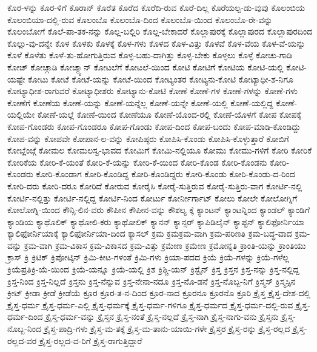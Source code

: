 {ಕೊರ-ಳನ್ನು
ಕೊರ-ಳಿಗೆ
ಕೊರಾನ್
ಕೊರೆತ
ಕೊರೆದ
ಕೊರೆದಿ-ರುವ
ಕೊರೆ-ದಿಲ್ಲ
ಕೊರೆಯಲ್ಪ-ಡು-ವುವು
ಕೊಲಂಬಿಯ
ಕೊಲಂಬಿಯಾ-ದಲ್ಲಿ-ರುವ
ಕೊಲಂಬೊ
ಕೊಲಂಬೊ-ದಿಂದ
ಕೊಲಂಬೊ-ಯಿಂದ
ಕೊಲಂಬೊ-ರೇ-ವನ್ನು
ಕೊಲಂಬೋಗೆ
ಕೊಲೆ-ಪಾ-ತಕ-ನನ್ನು
ಕೊಲ್ಲ-ಬಲ್ಲಿರಿ
ಕೊಲ್ಲ-ಬೇಕಾದರೆ
ಕೊಲ್ಲಾಪುರಕ್ಕೆ
ಕೊಲ್ಲಾಪುರದ
ಕೊಲ್ಲಾಪುರದಿಂದ
ಕೊಲ್ಲು-ವು-ದನ್ನೇ
ಕೊಳ
ಕೊಳಕು
ಕೊಳಕ್ಕೆ
ಕೊಳ-ಗಳು
ಕೊಳದ
ಕೊಳ-ವಿತ್ತು
ಕೊಳವೆ
ಕೊಳ-ವೆಯ
ಕೊಳ-ವೆ-ಯನ್ನು
ಕೊಳೆ
ಕೊಳೆತು
ಕೊಳೆ-ತು-ಹೋಗುತ್ತಿರುವ
ಕೊಳ್ಳ-ಬಹು-ದಾಗಿತ್ತು
ಕೊಳ್ಳ-ಬೇಕು
ಕೊಳ್ಳಲು
ಕೊಳ್ಳೆ
ಕೋಚು-ಗಾಡಿ
ಕೋಚ್
ಕೋಚ್ಗಾಡಿ
ಕೋಚ್ಮ್ಯಾನ್
ಕೋಟಲೆಗೆ
ಕೋಟಲೆ-ಯಿಂದ
ಕೋಟಿ
ಕೋಟಿಗೆ
ಕೋಟಿಯ
ಕೋಟಿ-ಯಲ್ಲಿ
ಕೋಟಿ-ಯಷ್ಟೇ
ಕೋಟು
ಕೋಟೆ
ಕೋಟೆ-ಯನ್ನು
ಕೋಟೆ-ಯಿಂದ
ಕೋಟ್ಯಂತರ
ಕೋಟ್ಯನು-ಕೋಟಿ
ಕೋಟ್ಯಾಧೀ-ಶ-ನಿಗೂ
ಕೋಟ್ಯಾಧೀಶ-ರಾಗುವರೆ
ಕೋಟ್ಯಾಧೀಶರು
ಕೋಟ್ಯಾನು-ಕೋಟಿ
ಕೋಣೆ
ಕೋಣೆ-ಗಳ
ಕೋಣೆ-ಗಳನ್ನು
ಕೋಣೆ-ಗಳು
ಕೋಣೆಗೆ
ಕೋಣೆಯ
ಕೋಣೆ-ಯನ್ನು
ಕೋಣೆ-ಯನ್ನೆಲ್ಲ
ಕೋಣೆ-ಯನ್ನೇ
ಕೋಣೆ-ಯಲ್ಲಿ
ಕೋಣೆ-ಯಲ್ಲಿದ್ದ
ಕೋಣೆ-ಯಲ್ಲಿಯೇ
ಕೋಣೆ-ಯಲ್ಲೆ
ಕೋಣೆ-ಯಿಂದ
ಕೋಣೆಯೂ
ಕೋಣೆ-ಯೊಂದ-ರಲ್ಲಿ
ಕೋಣೆ-ಯೊಳಗೆ
ಕೋಪ
ಕೋಪಕ್ಕೆ
ಕೋಪ-ಗೊಂಡರು
ಕೋಪ-ಗೊಂಡರೂ
ಕೋಪ-ಗೊಂಡು
ಕೋಪ-ದಿಂದ
ಕೋಪ-ಬಂದು
ಕೋಪ-ಮಾಡಿ-ಕೊಂಡಿದ್ದು
ಕೋಪ-ವನ್ನು
ಕೋಪವೇ
ಕೋಪಾನ-ಲ-ವನ್ನು
ಕೋಪಿಷ್ಠರು
ಕೋಪಿಸಿ-ಕೊಂಡು
ಕೋಪಿಸಿ-ಕೊಳ್ಳುತ್ತಾರೆ
ಕೋಬಿಗೆ
ಕೋಬ್ಲೆಂಜ್ಗೆ
ಕೋಮಲ
ಕೋಮಲಸ್ವ-ಭಾವದ
ಕೋಮಿಗೆ
ಕೋಮಿ-ನಲ್ಲಿಯೂ
ಕೋಮು
ಕೋಮು-ಗಳಿಗೆ
ಕೋರಿ
ಕೋರಿಕೆ
ಕೋರಿಕೆಯ
ಕೋರಿ-ಕೆ-ಯಂತೆ
ಕೋರಿ-ಕೆ-ಯನ್ನು
ಕೋರಿ-ಕೆ-ಯಿಂದ
ಕೋರಿ-ಕೊಂಡ
ಕೋರಿ-ಕೊಂಡನು
ಕೋರಿ-ಕೊಂಡರು
ಕೋರಿ-ಕೊಂಡಾಗ
ಕೋರಿ-ಕೊಂಡಿದ್ದ
ಕೋರಿ-ಕೊಂಡಿದ್ದರು
ಕೋರಿ-ಕೊಂಡು
ಕೋರಿ-ಕೊಂಡು-ದ-ರಿಂದ
ಕೋರಿ-ದರು
ಕೋರಿ-ದರೂ
ಕೋರಿದೆ
ಕೋರುವ
ಕೋರೈಸಿ
ಕೋರೈ-ಸುತ್ತಿರುವ
ಕೋರೈ-ಸುತ್ತಿರು-ವಾಗ
ಕೋರ್ಟಿ-ನಲ್ಲಿ
ಕೋರ್ಟಿ-ನಲ್ಲಿತ್ತು
ಕೋರ್ಟಿ-ನಲ್ಲಿದ್ದ
ಕೋರ್ಟಿ-ನಿಂದ
ಕೋರ್ಟು
ಕೋರ್ನೀರ್ಗಾಟ್
ಕೋಲು
ಕೋಲೇ
ಕೋಲೋಗ್ನಿಗೆ
ಕೋಲೋಗ್ನಿ-ಯಿಂದ
ಕೌನ್ಸಿ-ಲಿನ-ವರು
ಕೌಪೀನ
ಕೌಪೀನ-ವನ್ನು
ಕೌಶಲ್ಯ
ಕ್ಕೆ
ಕ್ಯಾಂಟನ್
ಕ್ಯಾಂಟನ್ನಿಂದ
ಕ್ಯಾಂಡಲ್
ಕ್ಯಾಂಡಿಗೆ
ಕ್ಯಾಂಡಿಯ
ಕ್ಯಾಥೊಲಿಕ್
ಕ್ಯಾಥೋಲಿ-ಕರು
ಕ್ಯಾಥೋಲಿಕ್
ಕ್ಯಾನನ್
ಕ್ಯಾನ್ಸರ್
ಕ್ಯಾಪಿಡಿಲೈನ್
ಕ್ಯಾಪ್ಟನ್
ಕ್ಯಾಲಿಫೋರ್ನಿಯಾ
ಕ್ಯಾಲಿಫೋರ್ನಿಯಾಕ್ಕೆ
ಕ್ಯಾಲಿಫೋರ್ನಿಯಾ-ದಿಂದ
ಕ್ಯಾಸಲ್
ಕ್ರಮ
ಕ್ರಮಕ್ರಮ-ವಾಗಿ
ಕ್ರಮ-ಪರಿಣತಿ
ಕ್ರಮ-ಬದ್ಧ-ವಾದ
ಕ್ರಮ-ವನ್ನು
ಕ್ರಮ-ವಾಗಿ
ಕ್ರಮ-ವಿಕಾಸ
ಕ್ರಮ-ವಿಕಾಸದ
ಕ್ರಮ-ವಿತ್ತು
ಕ್ರಮೇಣ
ಕ್ರಮೇಣ
ಕ್ರಮೋನ್ನತಿ
ಕ್ರಾಂತಿ-ಯನ್ನು
ಕ್ರಾಂತಿಯು
ಕ್ರಾಸ್
ಕ್ರಿ
ಕ್ರಿಟಿಕ್
ಕ್ರಿಪೋಟ್ಕಿನ್
ಕ್ರಿಮಿ-ಕೀಟ-ಗಳಂತೆ
ಕ್ರಿಮಿ-ಗಳು
ಕ್ರಿಯಾ-ಪದದ
ಕ್ರಿಯೆ
ಕ್ರಿಯೆ-ಗಳನ್ನು
ಕ್ರಿಯೆ-ಗಳೆಲ್ಲ
ಕ್ರಿಯೆಪ್ರತಿಕ್ರಿ-ಯೆ-ಯಿಂದ
ಕ್ರಿಯೆ-ಯನ್ನೂ
ಕ್ರಿಯೆ-ಯಲ್ಲಿ
ಕ್ರಿಶ
ಕ್ರಿಶ್ಚಿ-ಯನ್
ಕ್ರಿಸ್ಟೈನ್
ಕ್ರಿಸ್ತ
ಕ್ರಿಸ್ತನ
ಕ್ರಿಸ್ತ-ನನ್ನು
ಕ್ರಿಸ್ತ-ನಲ್ಲಿದ್ದ
ಕ್ರಿಸ್ತ-ನಿಂದ
ಕ್ರಿಸ್ತ-ನಿಲ್ಲದೆ
ಕ್ರಿಸ್ತನು
ಕ್ರಿಸ್ತ-ನೆನ್ನುವ
ಕ್ರಿಸ್ತ-ನೇನಾ-ನದೂ
ಕ್ರಿಸ್ತ-ನೊ-ಡನೆ
ಕ್ರಿಸ್ತ-ನೊಬ್ಬ-ನಿಗೆ
ಕ್ರಿಸ್ಮಸ್
ಕ್ರಿಸ್ಮಸ್ಸಿನ
ಕ್ರೀಟ್
ಕ್ರೀಡಾ
ಕ್ರೀಡೆ
ಕ್ರೀಡೆಯೆ
ಕ್ರೂರ
ಕ್ರೂರ-ತ-ನ-ದಿಂದ
ಕ್ರೂರ-ನಾದ
ಕ್ರೂರನೂ
ಕ್ರೂರನೊ
ಕ್ರೂರಿ
ಕ್ರೈಸ್ತ
ಕ್ರೈಸ್ತ-ದೇಶ-ದಲ್ಲಿ
ಕ್ರೈಸ್ತ-ಧರ್ಮ
ಕ್ರೈಸ್ತ-ಧರ್ಮ-ಎಲ್ಲಿ
ಕ್ರೈಸ್ತ-ಧರ್ಮಕ್ಕೆ
ಕ್ರೈಸ್ತ-ಧರ್ಮ-ಗಳಿಗೂ
ಕ್ರೈಸ್ತ-ಧರ್ಮದ
ಕ್ರೈಸ್ತ-ಧರ್ಮ-ದಲ್ಲಿ-ರುವ
ಕ್ರೈಸ್ತ-ಧರ್ಮ-ದಿಂದ
ಕ್ರೈಸ್ತ-ಧರ್ಮ-ವನ್ನು
ಕ್ರೈಸ್ತನ
ಕ್ರೈಸ್ತ-ನಂತೆ
ಕ್ರೈಸ್ತ-ನಲ್ಲದೆ
ಕ್ರೈಸ್ತ-ನಾಗಿ
ಕ್ರೈಸ್ತ-ನಾಗು-ವನು
ಕ್ರೈಸ್ತನು
ಕ್ರೈಸ್ತ-ನೊಬ್ಬ-ನಿಂದ
ಕ್ರೈಸ್ತ-ಪಾದ್ರಿ-ಗಳು
ಕ್ರೈಸ್ತ-ಮ-ತಕ್ಕೆ
ಕ್ರೈಸ್ತ-ಮ-ತಾನು-ಯಾಯಿ-ಗಳೇ
ಕ್ರೈಸ್ತರ
ಕ್ರೈಸ್ತ-ರನ್ನು
ಕ್ರೈಸ್ತ-ರಲ್ಲದ
ಕ್ರೈಸ್ತ-ರಲ್ಲದ-ವರ
ಕ್ರೈಸ್ತ-ರಲ್ಲದ-ವ-ರಿಗೆ
ಕ್ರೈಸ್ತ-ರಾಗುತ್ತಿದ್ದಾರೆ
}

